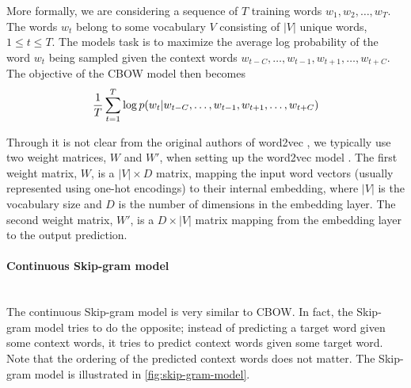 More formally, we are considering a sequence of $T$ training words $w_1, w_2, \ldots, w_T$. The words $w_t$ belong to some vocabulary $V$ consisting of $|V|$ unique words, $1 \leq t \leq T$. The models task is to maximize the average log probability of the word $w_t$ being sampled given the context words $w_{t-C}, \ldots, w_{t-1}, w_{t+1}, \ldots, w_{t+C}$. The objective of the CBOW model then becomes
\begin{align}
    \frac{1}{T} \sum\limits_{t=1}^{T} \log p(w_t | w_{t-C}, \ldots, w_{t-1}, w_{t+1}, \ldots, w_{t+C})
    \label{eqn:cbow-objective-function}
\end{align}

Through it is not clear from the original authors of word2vec \cite{mikolov2013a, mikolov2013b}, we typically use two weight matrices, $W$ and $W'$, when setting up the word2vec model \cite{rong2016word2vec}. The first weight matrix, $W$, is a $|V| \times D$ matrix, mapping the input word vectors (usually represented using one-hot encodings) to their internal embedding, where $|V|$ is the vocabulary size and $D$ is the number of dimensions in the embedding layer. The second weight matrix, $W'$, is a $D \times |V|$ matrix mapping from the embedding layer to the output prediction.

\paragraph*{Continuous Skip-gram model}\mbox{} \\
The continuous Skip-gram model is very similar to CBOW. In fact, the Skip-gram model tries to do the opposite; instead of predicting a target word given some context words, it tries to predict context words given some target word. Note that the ordering of the predicted context words does not matter. The Skip-gram model is illustrated in \cref{fig:skip-gram-model}.

